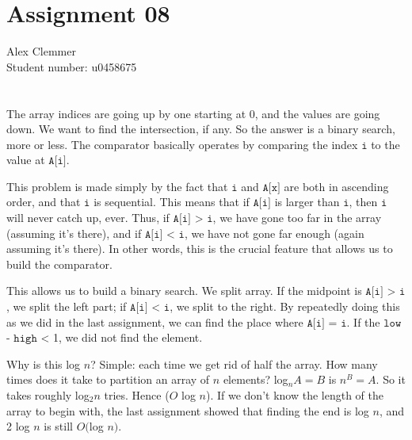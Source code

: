 \documentclass[a4paper]{article}
\begin{document}
\section*{Assignment 08}
Alex Clemmer\\
Student number: u0458675

\section*{}

The array indices are going up by one starting at 0, and the values are going down. We want to find the intersection, if any. So the answer is a binary search, more or less. The comparator basically operates by comparing the index $\texttt{i}$ to the value at $\texttt{A[i]}$.

This problem is made simply by the fact that $\texttt{i}$ and $\texttt{A[x]}$ are both in ascending order, and that $\texttt{i}$ is sequential. This means that if $\texttt{A[i]}$ is larger than $\texttt{i}$, then $\texttt{i}$ will never catch up, ever. Thus, if $\texttt{A[i]}$  > $\texttt{i}$, we have gone too far in the array (assuming it's there), and if $\texttt{A[i]}$ < $\texttt{i}$, we have not gone far enough (again assuming it's there). In other words, this is the crucial feature that allows us to build the comparator.

This allows us to build a binary search. We split array. If the midpoint is $\texttt{A[i]}$ > $\texttt{i}$, we split the left part; if $\texttt{A[i]}$ < $\texttt{i}$, we split to the right. By repeatedly doing this as we did in the last assignment, we can find the place where $\texttt{A[i]}$ = $\texttt{i}$. If the $\texttt{low}$ - $\texttt{high}$ < 1, we did not find the element.

Why is this log $n$? Simple: each time we get rid of half the array. How many times does it take to partition an array of $n$ elements? log$_n A = B$ is $n^B = A$. So it takes roughly log$_2 n$ tries. Hence ($O$ log $n$). If we don't know the length of the array to begin with, the last assignment showed that finding the end is log $n$, and 2 log $n$ is still $O($log $n)$.
\end{document}
